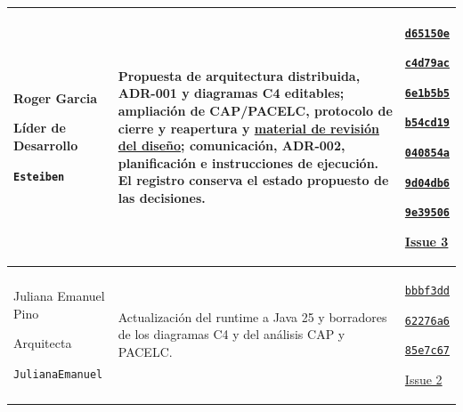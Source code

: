 {\begin{table}[H]
\begin{tabular}{|>{\raggedright\arraybackslash}p{}|>{\raggedright\arraybackslash}p{}|>{\raggedright\arraybackslash}p{}|}
    Roger Garcia\par Líder de Desarrollo\par\texttt{Esteiben} &
    Propuesta de arquitectura distribuida, ADR-001 y diagramas C4 editables;
    ampliación de CAP/PACELC, protocolo de cierre y reapertura y
    \href{https://github.com/Danxxx777/clab-pfc-7a/tree/main/evidencias/diseno}{material de revisión del diseño};
    comunicación, ADR-002, planificación e instrucciones de ejecución.
    El registro conserva el estado propuesto de las decisiones. &
    \href{https://github.com/Danxxx777/clab-pfc-7a/commit/d65150e}{\texttt{d65150e}}\par
    \href{https://github.com/Danxxx777/clab-pfc-7a/commit/c4d79ac}{\texttt{c4d79ac}}\par
    \href{https://github.com/Danxxx777/clab-pfc-7a/commit/6e1b5b5}{\texttt{6e1b5b5}}\par
    \href{https://github.com/Danxxx777/clab-pfc-7a/commit/b54cd19}{\texttt{b54cd19}}\par
    \href{https://github.com/Danxxx777/clab-pfc-7a/commit/040854a}{\texttt{040854a}}\par
    \href{https://github.com/Danxxx777/clab-pfc-7a/commit/9d04db6}{\texttt{9d04db6}}\par
    \href{https://github.com/Danxxx777/clab-pfc-7a/commit/9e39506}{\texttt{9e39506}}\par
    \href{https://github.com/Danxxx777/clab-pfc-7a/issues/3}{Issue 3}
    \\ \hline

    Juliana Emanuel Pino\par Arquitecta\par\texttt{JulianaEmanuel} &
    Actualización del runtime a Java 25 y borradores de los diagramas C4
    y del análisis CAP y PACELC. &
    \href{https://github.com/Danxxx777/clab-pfc-7a/commit/bbbf3dd}{\texttt{bbbf3dd}}\par
    \href{https://github.com/Danxxx777/clab-pfc-7a/commit/62276a6}{\texttt{62276a6}}\par
    \href{https://github.com/Danxxx777/clab-pfc-7a/commit/85e7c67}{\texttt{85e7c67}}\par
    \href{https://github.com/Danxxx777/clab-pfc-7a/issues/2}{Issue 2}
    \\ \hline


\end{tabular}
\end{table}}
